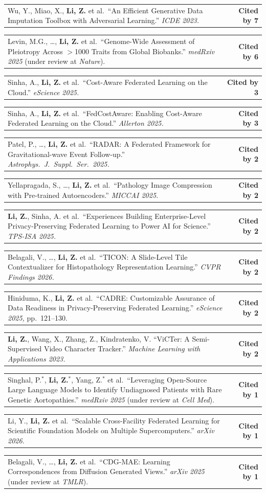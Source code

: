 \documentclass[letterpaper,11pt]{article}
\makeatletter
\newcommand{\CiteEntry}[2]{%
  \item \begin{tabularx}{\linewidth}[t]{@{}X@{\hspace{6pt}}r@{}}
    \small #1 & \small\textbf{Cited by #2}%
  \end{tabularx}%
}
\makeatother
\begin{document}
\begin{enumerate}[leftmargin=1cm, label={[\arabic*]}, itemsep=3pt]
  \CiteEntry{Wu, Y., Miao, X., \textbf{Li, Z.} et al.\ ``An Efficient Generative Data Imputation Toolbox with Adversarial Learning.'' \textit{ICDE 2023.}}{7}

  \CiteEntry{Levin, M.G., \ldots, \textbf{Li, Z.} et al.\ ``Genome-Wide Assessment of Pleiotropy Across $>$1000 Traits from Global Biobanks.'' \textit{medRxiv 2025} (under review at \textit{Nature}).}{6}

  \CiteEntry{Sinha, A., \textbf{Li, Z.} et al.\ ``Cost-Aware Federated Learning on the Cloud.'' \textit{eScience 2025.}}{3}

  \CiteEntry{Sinha, A., \textbf{Li, Z.} et al.\ ``FedCostAware: Enabling Cost-Aware Federated Learning on the Cloud.'' \textit{Allerton 2025.}}{3}

  \CiteEntry{Patel, P., \ldots, \textbf{Li, Z.} et al.\ ``RADAR: A Federated Framework for Gravitational-wave Event Follow-up.'' \textit{Astrophys.\ J.\ Suppl.\ Ser.\ 2025.}}{2}

  \CiteEntry{Yellapragada, S., \ldots, \textbf{Li, Z.} et al.\ ``Pathology Image Compression with Pre-trained Autoencoders.'' \textit{MICCAI 2025.}}{2}

  \CiteEntry{\textbf{Li, Z.}, Sinha, A. et al.\ ``Experiences Building Enterprise-Level Privacy-Preserving Federated Learning to Power AI for Science.'' \textit{TPS-ISA 2025.}}{2}

  \CiteEntry{Belagali, V., \ldots, \textbf{Li, Z.} et al.\ ``TICON: A Slide-Level Tile Contextualizer for Histopathology Representation Learning.'' \textit{CVPR Findings 2026.}}{2}

  \CiteEntry{Hiniduma, K., \textbf{Li, Z.} et al.\ ``CADRE: Customizable Assurance of Data Readiness in Privacy-Preserving Federated Learning.'' \textit{eScience 2025,} pp.\ 121--130.}{2}

  \CiteEntry{\textbf{Li, Z.}, Wang, X., Zhang, Z., Kindratenko, V. ``ViCTer: A Semi-Supervised Video Character Tracker.'' \textit{Machine Learning with Applications 2023.}}{2}


  \CiteEntry{Singhal, P.$^*$, \textbf{Li, Z.$^*$}, Yang, Z.$^*$ et al.\ ``Leveraging Open-Source Large Language Models to Identify Undiagnosed Patients with Rare Genetic Aortopathies.'' \textit{medRxiv 2025} (under review at \textit{Cell Med}).}{1}


  \CiteEntry{Li, Y., \textbf{Li, Z.} et al.\ ``Scalable Cross-Facility Federated Learning for Scientific Foundation Models on Multiple Supercomputers.'' \textit{arXiv 2026.}}{1}

  \CiteEntry{Belagali, V., \ldots, \textbf{Li, Z.} et al.\ ``CDG-MAE: Learning Correspondences from Diffusion Generated Views.'' \textit{arXiv 2025} (under review at \textit{TMLR}).}{1}

\end{enumerate}
\end{document}
